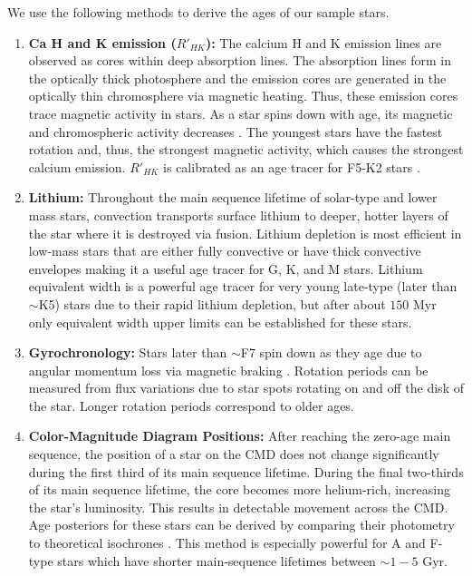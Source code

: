 We use the following methods to derive the ages of our sample stars.
 \begin{enumerate}
     \item  {\bf Ca H and K emission ($R'_{HK}$):} The calcium H and K emission lines are observed as cores within deep absorption lines. The absorption lines form in the optically thick photosphere and the emission cores are generated in the optically thin chromosphere via magnetic heating. Thus, these emission cores trace magnetic activity in stars. As a star spins down with age, its magnetic and chromospheric activity decreases . The youngest stars have the fastest rotation and, thus, the strongest magnetic activity, which causes the strongest calcium emission. $R'_{HK}$ is calibrated as an age tracer for F5-K2 stars . 
     
     \item {\bf Lithium:} Throughout the main sequence lifetime of solar-type and lower mass stars, convection transports surface lithium to deeper, hotter layers of the star where it is destroyed via fusion. Lithium depletion is most efficient in low-mass stars that are either fully convective or have thick convective envelopes \citep{1993AJ....105.2299S, 2021A&A...654A.137L, 2010ARA&A..48..581S} making it a useful age tracer for G, K, and M stars. Lithium equivalent width is a powerful age tracer for very young late-type (later than $\sim$K5) stars due to their rapid lithium depletion, but after about $150 $ Myr only equivalent width upper limits can be established for these stars.
     
     \item {\bf Gyrochronology:} Stars later than $\sim$F7 spin down as they age due to angular momentum loss via magnetic braking \citep{1967ApJ...150..551K}. Rotation periods can be measured from flux variations due to star spots rotating on and off the disk of the star. Longer rotation periods correspond to older ages.
     
     \item {\bf Color-Magnitude Diagram Positions:} After reaching the zero-age main sequence, the position of a star on the CMD does not change significantly during the first third of its main sequence lifetime. During the final two-thirds of its main sequence lifetime, the core becomes more helium-rich, increasing the star’s luminosity. This results in detectable movement across the CMD. Age posteriors for these stars can be derived by comparing their photometry to theoretical isochrones . This method is especially powerful for A and F-type stars which have shorter main-sequence lifetimes between $\sim1-5$ Gyr.  

 \end{enumerate}
 
